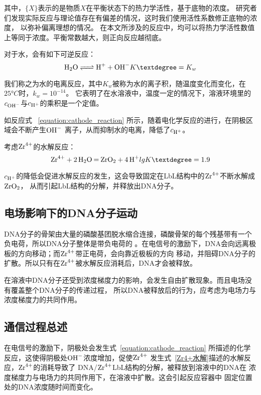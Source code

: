 其中，{$\{X\}$}表示的是物质$X$在平衡状态下的热力学活性，基于底物的浓度。
研究者们发现实际反应与理论值存在有偏差的情况，这时我们使用活性系数修正底物的浓度，
以弥补偏离理想的情况\cite{Königsberger2017}。
在本文所涉及的反应中，均可以将热力学活性数值上等同于浓度。平衡常数越大，则正向反应越彻底。

对于水，会有如下可逆反应：
\begin{equation}
    \ce{H2O <=> H+ + OH-} \quad K°=K_w
\end{equation}

我们称之为水的电离反应，其中$K_w$被称为水的离子积，随温度变化而变化，在$25°C$时，$k_w=10^{-14}$。
它表明了在水溶液中，温度一定的情况下，溶液环境里的$c_{\ce{OH-}}$与$c_{\ce{H+}}$的乘积是一个定值。

如反应式 ~\ref{equation:cathode_reaction} 所示，随着电化学反应的进行，在阴极区域会不断产生$\ce{OH-}$
离子，从而抑制水的电离，降低了$c_{\ce{H+}}$。

考虑$\ce{Zr^4+}$的水解反应\cite{Thoenen2004Development}：
\begin{equation}
    \ce{Zr^4+ +2 H2O  = ZrO2 + 4H+} \quad lgK°=1.9
    \label{Zr4+水解}
\end{equation}

$c_{\ce{H+}}$的降低会促进水解反应的发生，这会导致固定在LbL结构中的$\ce{Zr^4+}$不断水解成$\ce{ZrO2}$，
从而引起LbL结构的分解，并释放出DNA分子。

\subsection{电场影响下的DNA分子运动}
DNA分子的骨架由大量的磷酸基团脱水缩合连接，磷酸骨架的每个残基带有一个负电荷，所以DNA分子整体是带负电荷的
\cite{Lipfert2014}。在电信号的激励下，DNA会向远离极板的方向移动；而$\ce{Zr^4+}$带正电荷，会向靠近极板的方向
移动，并阻碍DNA分子的扩散。所以只有在$\ce{Zr^4+}$被水解反应消耗后，DNA才会被释放。

在溶液中DNA分子还受到浓度梯度力的影响，会发生自由扩散现象。而且电场没有覆盖整个DNA分子的传递过程，
所以DNA被释放后的行为，应考虑为电场力与浓度梯度力的共同作用。

\subsection{通信过程总述}
在电信号的激励下，阴极处会发生式~\ref{equation:cathode_reaction}
所描述的化学反应，这使得阴极处$\ce{OH-}$浓度增加，促使$\ce{Zr^4+}$
发生式~\ref{Zr4+水解}描述的水解反应，$\ce{Zr^4+}$的消耗导致了
DNA/$\ce{Zr^{4+}}$LbL结构的分解，被释放到溶液中的DNA在
浓度梯度力与电场力的共同作用下，在溶液中扩散。这会引起反应容器中
固定位置处的DNA浓度随时间而变化。


